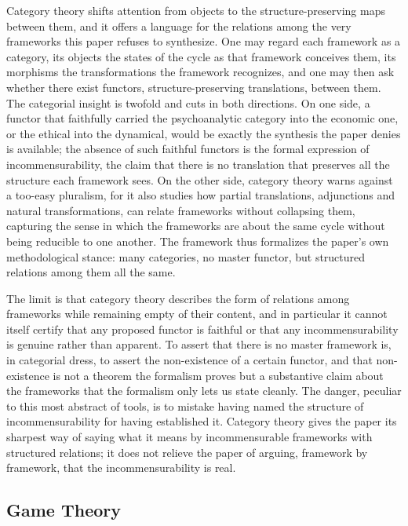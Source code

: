 Category theory shifts attention from objects to the structure-preserving maps between them, and it offers a language for the relations among the very frameworks this paper refuses to synthesize. One may regard each framework as a category, its objects the states of the cycle as that framework conceives them, its morphisms the transformations the framework recognizes, and one may then ask whether there exist functors, structure-preserving translations, between them. The categorial insight is twofold and cuts in both directions. On one side, a functor that faithfully carried the psychoanalytic category into the economic one, or the ethical into the dynamical, would be exactly the synthesis the paper denies is available; the absence of such faithful functors is the formal expression of incommensurability, the claim that there is no translation that preserves all the structure each framework sees. On the other side, category theory warns against a too-easy pluralism, for it also studies how partial translations, adjunctions and natural transformations, can relate frameworks without collapsing them, capturing the sense in which the frameworks are about the same cycle without being reducible to one another. The framework thus formalizes the paper's own methodological stance: many categories, no master functor, but structured relations among them all the same.

The limit is that category theory describes the form of relations among frameworks while remaining empty of their content, and in particular it cannot itself certify that any proposed functor is faithful or that any incommensurability is genuine rather than apparent. To assert that there is no master framework is, in categorial dress, to assert the non-existence of a certain functor, and that non-existence is not a theorem the formalism proves but a substantive claim about the frameworks that the formalism only lets us state cleanly. The danger, peculiar to this most abstract of tools, is to mistake having named the structure of incommensurability for having established it. Category theory gives the paper its sharpest way of saying what it means by incommensurable frameworks with structured relations; it does not relieve the paper of arguing, framework by framework, that the incommensurability is real.

\subsection{Game Theory}

